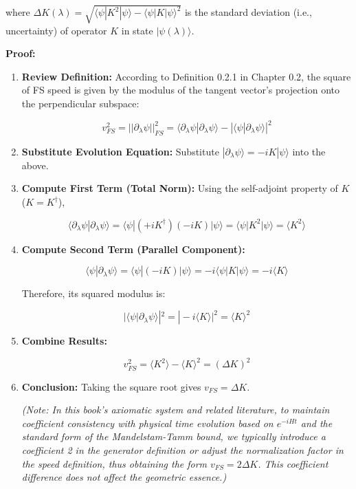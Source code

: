 \documentclass[11pt,a4paper,twoside]{book}
\begin{document}
where \textbf{$\Delta K(\lambda) = \sqrt{\langle \psi | K^2 | \psi \rangle - \langle \psi | K | \psi \rangle^2}$} is the standard deviation (i.e., uncertainty) of operator \textbf{$K$} in state \textbf{$|\psi(\lambda)\rangle$}.

\textbf{Proof:}

\begin{enumerate}
\item \textbf{Review Definition:} According to Definition 0.2.1 in Chapter 0.2, the square of FS speed is given by the modulus of the tangent vector's projection onto the perpendicular subspace:

   $$v_{FS}^2 = ||\partial_{\lambda}\psi||_{FS}^2 = \langle \partial_{\lambda}\psi | \partial_{\lambda}\psi \rangle - |\langle \psi | \partial_{\lambda}\psi \rangle|^2$$

\item \textbf{Substitute Evolution Equation:} Substitute \textbf{$|\partial_{\lambda}\psi\rangle = -i K |\psi\rangle$} into the above.

\item \textbf{Compute First Term (Total Norm):} Using the self-adjoint property of \textbf{$K$} (\textbf{$K=K^{\dagger}$}),

   $$\langle \partial_{\lambda}\psi | \partial_{\lambda}\psi \rangle = \langle \psi | (+i K^{\dagger}) (-i K) | \psi \rangle = \langle \psi | K^2 | \psi \rangle = \langle K^2 \rangle$$

\item \textbf{Compute Second Term (Parallel Component):}

   $$\langle \psi | \partial_{\lambda}\psi \rangle = \langle \psi | (-i K) | \psi \rangle = -i \langle \psi | K | \psi \rangle = -i \langle K \rangle$$

   Therefore, its squared modulus is:

   $$|\langle \psi | \partial_{\lambda}\psi \rangle|^2 = |-i \langle K \rangle|^2 = \langle K \rangle^2$$

\item \textbf{Combine Results:}

   $$v_{FS}^2 = \langle K^2 \rangle - \langle K \rangle^2 = (\Delta K)^2$$

\item \textbf{Conclusion:} Taking the square root gives \textbf{$v_{FS} = \Delta K$}.

   \textit{(Note: In this book's axiomatic system and related literature, to maintain coefficient consistency with physical time evolution based on $e^{-iHt}$ and the standard form of the Mandelstam-Tamm bound, we typically introduce a coefficient 2 in the generator definition or adjust the normalization factor in the speed definition, thus obtaining the form \textbf{$v_{FS} = 2\Delta K$}. This coefficient difference does not affect the geometric essence.)}
\end{enumerate}
\end{document}
